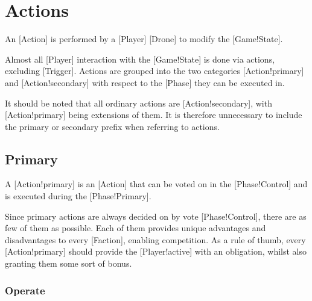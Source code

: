 \chapter{Actions}

An [Action] is performed by a [Player] [Drone] to modify the [Game!State].

Almost all [Player] interaction with the [Game!State] is done via actions, excluding [Trigger].
Actions are grouped into the two categories [Action!primary] and [Action!secondary] with respect to the [Phase] they can be executed in.

It should be noted that all ordinary actions are [Action!secondary], with [Action!primary] being extensions of them.
It is therefore unnecessary to include the primary or secondary prefix when referring to actions.


\section{Primary}

A [Action!primary] is an [Action] that can be voted on in the [Phase!Control] and is executed during the [Phase!Primary].

Since primary actions are always decided on by vote [Phase!Control], there are as few of them as possible.
Each of them provides unique advantages and disadvantages to every [Faction], enabling competition.
As a rule of thumb, every [Action!primary] should provide the [Player!active] with an obligation, whilst also granting them some sort of bonus.

\subsection{Operate}


